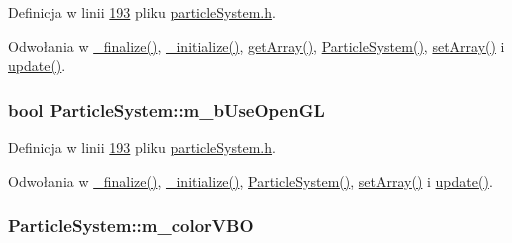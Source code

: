 Definicja w linii \hyperlink{particle_system_8h_source_l00193}{193} pliku \hyperlink{particle_system_8h_source}{particle\-System.\-h}.



Odwołania w \hyperlink{particle_system_8cpp_source_l00233}{\-\_\-finalize()}, \hyperlink{particle_system_8cpp_source_l00142}{\-\_\-initialize()}, \hyperlink{particle_system_8cpp_source_l00375}{get\-Array()}, \hyperlink{particle_system_8cpp_source_l00040}{Particle\-System()}, \hyperlink{particle_system_8cpp_source_l00403}{set\-Array()} i \hyperlink{particle_system_8cpp_source_l00266}{update()}.

\hypertarget{class_particle_system_a5d99413ffc0791e6aa9f02308caf7f1e}{
\subsubsection[{m\-\_\-b\-Use\-Open\-G\-L}]{\setlength{\rightskip}{0pt plus 5cm}bool Particle\-System\-::m\-\_\-b\-Use\-Open\-G\-L\hspace{0.3cm}{\ttfamily [protected]}}}\label{class_particle_system_a5d99413ffc0791e6aa9f02308caf7f1e}


Definicja w linii \hyperlink{particle_system_8h_source_l00193}{193} pliku \hyperlink{particle_system_8h_source}{particle\-System.\-h}.



Odwołania w \hyperlink{particle_system_8cpp_source_l00233}{\-\_\-finalize()}, \hyperlink{particle_system_8cpp_source_l00142}{\-\_\-initialize()}, \hyperlink{particle_system_8cpp_source_l00040}{Particle\-System()}, \hyperlink{particle_system_8cpp_source_l00403}{set\-Array()} i \hyperlink{particle_system_8cpp_source_l00266}{update()}.

\hypertarget{class_particle_system_a96b05c719006c9e3eaed759f54a49c7f}{
\subsubsection[{m\-\_\-color\-V\-B\-O}]{ Particle\-System\-::m\-\_\-color\-V\-B\-O\hspace{0.3cm}{\ttfamily [protected]}}}\label{class_particle_system_a96b05c719006c9e3eaed759f54a49c7f}


